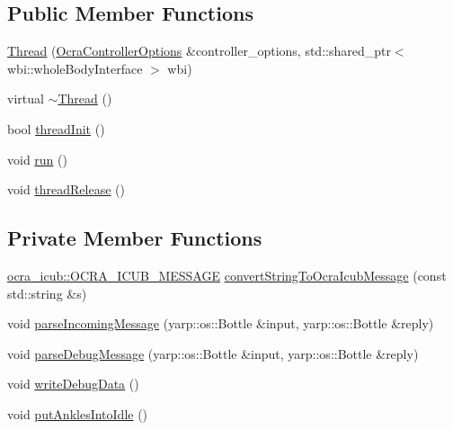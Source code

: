 \subsection*{\-Public \-Member \-Functions}
\begin{DoxyCompactItemize}
\item 
\hyperlink{classThread_a7494a3cf676527432ee724d59ed9ee8f}{\-Thread} (\hyperlink{classOcraControllerOptions}{\-Ocra\-Controller\-Options} \&controller\-\_\-options, std\-::shared\-\_\-ptr$<$ wbi\-::whole\-Body\-Interface $>$ wbi)
\item 
virtual \hyperlink{classThread_a37d9edd3a1a776cbc27dedff949c9726}{$\sim$\-Thread} ()
\item 
bool \hyperlink{classThread_a1e840470cd71d7bfb2430d24169e3dce}{thread\-Init} ()
\item 
void \hyperlink{classThread_ad9373d8d725c46717dfce3130018fe3a}{run} ()
\item 
void \hyperlink{classThread_aa2856c7d45670f45d66bcb319255defe}{thread\-Release} ()
\end{DoxyCompactItemize}
\subsection*{\-Private \-Member \-Functions}
\begin{DoxyCompactItemize}
\item 
\hyperlink{namespaceocra__icub_afbd2db66b68005fb7cfac19210caf83f}{ocra\-\_\-icub\-::\-O\-C\-R\-A\-\_\-\-I\-C\-U\-B\-\_\-\-M\-E\-S\-S\-A\-G\-E} \hyperlink{classThread_a2c64d83df66f7168d34993b76a179dde}{convert\-String\-To\-Ocra\-Icub\-Message} (const std\-::string \&s)
\item 
void \hyperlink{classThread_ae21029d250ac7c720f2411eab71a9414}{parse\-Incoming\-Message} (yarp\-::os\-::\-Bottle \&input, yarp\-::os\-::\-Bottle \&reply)
\item 
void \hyperlink{classThread_a6ce5ef9684cb2793be85e7402ad672f0}{parse\-Debug\-Message} (yarp\-::os\-::\-Bottle \&input, yarp\-::os\-::\-Bottle \&reply)
\item 
void \hyperlink{classThread_a9af0e98aa9b1de2f5c7bfa2f6e5001a2}{write\-Debug\-Data} ()
\item 
void \hyperlink{classThread_a49b65da88eb521ff53ef94d6ec8da7ab}{put\-Ankles\-Into\-Idle} ()
\end{DoxyCompactItemize}
